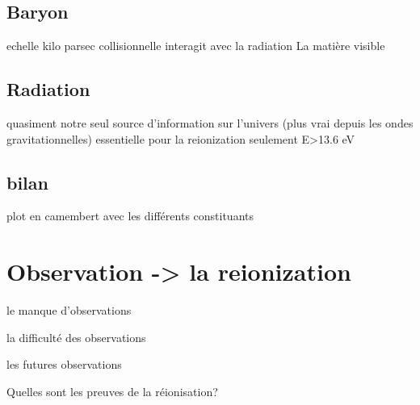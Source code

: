 \subsection{Baryon}

echelle kilo parsec
collisionnelle
interagit avec la radiation
La matière visible

\subsection{Radiation}

quasiment notre seul source d'information sur l'univers (plus vrai depuis les ondes gravitationnelles)
essentielle pour la reionization
seulement E>13.6 eV

\subsection{bilan}

plot en camembert avec les différents constituants

\section{Observation -> la reionization}

le manque d'observations

la difficulté des observations

les futures observations

Quelles sont les preuves de la réionisation?

